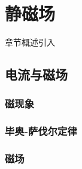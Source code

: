 \chapter{静磁场}\label{18}

章节概述引入

\section{电流与磁场}\label{18-1}

\subsection{磁现象}\label{18-1-1}

\subsection{毕奥-萨伐尔定律}\label{18-1-2}

\subsection{磁场}\label{18-1-3}

